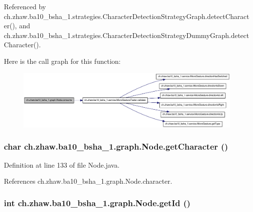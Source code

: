Referenced by ch.zhaw.ba10\_\-bsha\_\-1.strategies.CharacterDetectionStrategyGraph.detectCharacter(), and ch.zhaw.ba10\_\-bsha\_\-1.strategies.CharacterDetectionStrategyDummyGraph.detectCharacter().

Here is the call graph for this function:\nopagebreak
\begin{figure}[H]
\begin{center}
\leavevmode
\includegraphics[width=420pt]{classch_1_1zhaw_1_1ba10__bsha__1_1_1graph_1_1Node_a985b135e0ae7c0453985cd1dacdc4bc7_cgraph}
\end{center}
\end{figure}
\hypertarget{classch_1_1zhaw_1_1ba10__bsha__1_1_1graph_1_1Node_a0e84a9cb9ac03506d3a46af0a8f288f5}{
\subsubsection[{getCharacter}]{\setlength{\rightskip}{0pt plus 5cm}char ch.zhaw.ba10\_\-bsha\_\-1.graph.Node.getCharacter ()}}
\label{classch_1_1zhaw_1_1ba10__bsha__1_1_1graph_1_1Node_a0e84a9cb9ac03506d3a46af0a8f288f5}


Definition at line 133 of file Node.java.

References ch.zhaw.ba10\_\-bsha\_\-1.graph.Node.character.\hypertarget{classch_1_1zhaw_1_1ba10__bsha__1_1_1graph_1_1Node_a725596466df160f7aa65009dbd29e3d8}{
\subsubsection[{getId}]{\setlength{\rightskip}{0pt plus 5cm}int ch.zhaw.ba10\_\-bsha\_\-1.graph.Node.getId ()}}
\label{classch_1_1zhaw_1_1ba10__bsha__1_1_1graph_1_1Node_a725596466df160f7aa65009dbd29e3d8}


